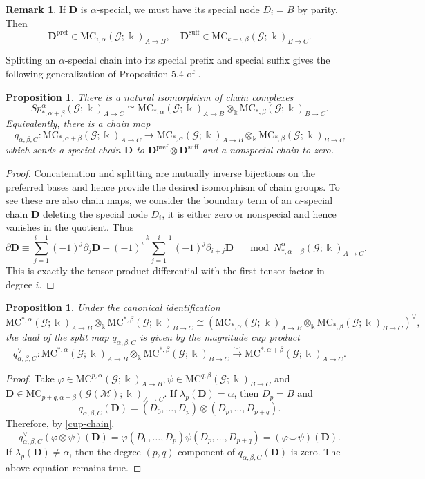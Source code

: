 \documentclass[10pt]{amsart}
\theoremstyle{plain}
\newtheorem{proposition}[theorem]{Proposition}
\theoremstyle{definition}
\newtheorem{remark}[theorem]{Remark}
\newcommand{\G}{\mathcal{G}}
\newcommand{\MC}{\mathrm{MC}}
\newcommand{\M}{\mathcal{M}}
\newcommand{\kk}{\Bbbk}
\newcommand{\bD}{\boldsymbol{D}}
\begin{document}
\begin{remark}
If $\bD$ is $\alpha$-special, we must have its special node $D_i=B$ by parity. Then
\[
\bD^{\mathrm{pref}}\in\MC_{i,\alpha}(\G;\kk)_{A\to B},\quad \bD^{\mathrm{suff}}\in\MC_{k-i,\beta}(\G;\kk)_{B\to C}.
\]
\end{remark}

Splitting an $\alpha$-special chain into its special prefix and special suffix gives the following generalization of Proposition 5.4 of \cite{Koizumi2026a}.

\begin{proposition}\label{split-quotient}
There is a natural isomorphism of chain complexes
\[
Sp^\alpha_{*,\alpha+\beta}(\G;\kk)_{A\to C}\cong\MC_{*,\alpha}(\G;\kk)_{A\to B}\otimes_\kk\MC_{*,\beta}(\G;\kk)_{B\to C}.
\]
Equivalently, there is a chain map
\[
q_{\alpha,\beta,C}:\MC_{*,\alpha+\beta}(\G;\kk)_{A\to C}\to\MC_{*,\alpha}(\G;\kk)_{A\to B}\otimes_\kk\MC_{*,\beta}(\G;\kk)_{B\to C}
\]
which sends a special chain $\bD$ to $\bD^{\mathrm{pref}}\otimes\bD^{\mathrm{suff}}$ and a nonspecial chain to zero.
\end{proposition}

\begin{proof}
Concatenation and splitting are mutually inverse bijections on the preferred bases and hence provide the desired isomorphism of chain groups. To see these are also chain maps, we consider the boundary term of an $\alpha$-special chain $\bD$ deleting the special node $D_i$, it is either zero or nonspecial and hence vanishes in the quotient. Thus
\[
\partial\bD\equiv\sum_{j=1}^{i-1}(-1)^j\partial_j\bD+(-1)^i\sum_{j=1}^{k-i-1}(-1)^j\partial_{i+j}\bD\quad \mod N_{*,\alpha+\beta}^{\alpha}(\G;\kk)_{A\to C}.
\]
This is exactly the tensor product differential with the first tensor factor in degree $i$.
\end{proof}

\begin{proposition}\label{cup-dual-split}
Under the canonical identification
\[
\MC^{*,\alpha}(\G;\kk)_{A\to B}\otimes_{\kk}\MC^{*,\beta}(\G;\kk)_{B\to C}\cong\left(\MC_{*,\alpha}(\G;\kk)_{A\to B}\otimes_{\kk}\MC_{*,\beta}(\G;\kk)_{B\to C}\right)^\vee,
\]
the dual of the split map $q_{\alpha,\beta,C}$ is given by the magnitude cup product
\[
q_{\alpha,\beta,C}^{\vee}:\MC^{*,\alpha}(\G;\kk)_{A\to B}\otimes_{\kk}\MC^{*,\beta}(\G;\kk)_{B\to C}\xrightarrow{\smile}\MC^{*,\alpha+\beta}(\G;\kk)_{A\to C}.
\]
\end{proposition}

\begin{proof}
Take $\varphi\in\MC^{p,\alpha}(\G;\kk)_{A\to B}, \psi\in\MC^{q,\beta}(\G;\kk)_{B\to C}$ and $\bD\in\MC_{p+q,\alpha+\beta}(\G(\M);\kk)_{A\to C}$. If $\lambda_p(\bD)=\alpha$, then $D_p=B$ and
\[
q_{\alpha,\beta,C}(\bD)=(D_0,\ldots,D_p)\otimes(D_p,\ldots,D_{p+q}).
\]
Therefore, by \eqref{cup-chain},
\[
q_{\alpha,\beta,C}^\vee (\varphi\otimes\psi)(\bD)=\varphi(D_0,\ldots,D_p)\psi(D_p,\ldots,D_{p+q})=(\varphi\smile\psi)(\bD).
\]
If $\lambda_p(\bD)\neq\alpha$, then the degree $(p,q)$ component of $q_{\alpha,\beta,C}(\bD)$ is zero. The above equation remains true.
\end{proof}
\end{document}
